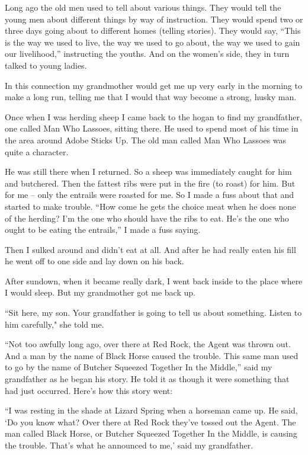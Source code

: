 Long ago the old men used to tell about various things. They would tell the young men about different things by way of instruction. They would spend two or three days going about to different homes (telling stories). They would say, ``This is the way we used to live, the way we used to go about, the way we used to gain our livelihood,'' instructing the youths. And on the women's side, they in turn talked to young ladies.

In this connection my grandmother would get me up very early in the morning to make a long run, telling me that I would that way become a strong, husky man.

Once when I was herding sheep I came back to the hogan to find my grandfather, one called Man Who Lassoes, sitting there. He used to spend most of his time in the area around Adobe Sticks Up. The old man called Man Who Lassoes was quite a character.

He was still there when I returned. So a sheep was immediately caught for him and butchered. Then the fattest ribs were put in the fire (to roast) for him. But for me -- only the entrails were roasted for me. So I made a fuss about that and started to make trouble.
``How come he gets the choice meat when he does none of the herding? I'm the one who should have the ribs to eat. He's the one who ought to be eating the entrails,'' I made a fuss saying.

Then I sulked around and didn't eat at all. And after he had really eaten his fill he went off to one side and lay down on his back.

After sundown, when it became really dark, I went back inside to the place where I would sleep. But my grandmother got me back up.

``Sit here, my son. Your grandfather is going to tell us about something. Listen to him carefully," she told me.

``Not too awfully long ago, over there at Red Rock, the Agent was thrown out. And a man by the name of Black Horse caused the trouble. This same man used to go by the name of Butcher Squeezed Together In the Middle,'' said my grandfather as he began his story. He told it as though it were something that had just occurred. Here's how this story went:

``I was resting in the shade at Lizard Spring when a horseman came up. He said, `Do you know what? Over there at Red Rock they've tossed out the Agent. The man called Black Horse, or Butcher Squeezed Together In the Middle, is causing the trouble. That's what he announced to me,' said my grandfather.

